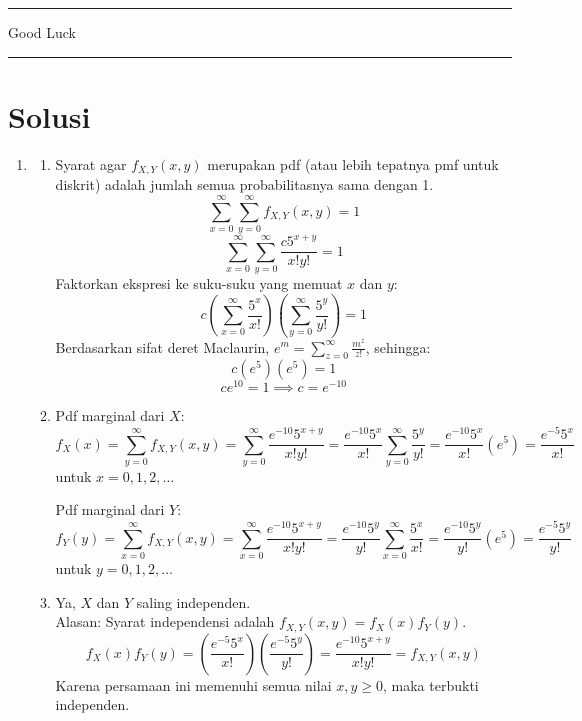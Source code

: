 \documentclass[12pt,a4paper]{article}
\begin{document}
\vspace{1cm}
\begin{center}
  \rule{3cm}{1.5pt} Good Luck \rule{3cm}{1.5pt}
\end{center}

\newpage
\section*{Solusi}

\begin{enumerate}
  \item
        \begin{enumerate}[label=(\alph*)]
          \item Syarat agar $f_{X,Y}(x,y)$ merupakan pdf (atau lebih tepatnya pmf untuk diskrit) adalah jumlah semua probabilitasnya sama dengan 1.
                \[ \sum_{x=0}^{\infty} \sum_{y=0}^{\infty} f_{X,Y}(x,y) = 1 \]
                \[ \sum_{x=0}^{\infty} \sum_{y=0}^{\infty} \frac{c5^{x+y}}{x!y!} = 1 \]
                Faktorkan ekspresi ke suku-suku yang memuat $x$ dan $y$:
                \[ c \left( \sum_{x=0}^{\infty} \frac{5^x}{x!} \right) \left( \sum_{y=0}^{\infty} \frac{5^y}{y!} \right) = 1 \]
                Berdasarkan sifat deret Maclaurin, $e^m = \sum_{z=0}^{\infty} \frac{m^z}{z!}$, sehingga:
                \[ c (e^5) (e^5) = 1 \]
                \[ c e^{10} = 1 \implies c = e^{-10} \]

          \item Pdf marginal dari $X$:
                \[ f_X(x) = \sum_{y=0}^{\infty} f_{X,Y}(x,y) = \sum_{y=0}^{\infty} \frac{e^{-10} 5^{x+y}}{x!y!} = \frac{e^{-10} 5^x}{x!} \sum_{y=0}^{\infty} \frac{5^y}{y!} = \frac{e^{-10} 5^x}{x!} (e^5) = \frac{e^{-5} 5^x}{x!} \]
                untuk $x = 0, 1, 2, \dots$

                Pdf marginal dari $Y$:
                \[ f_Y(y) = \sum_{x=0}^{\infty} f_{X,Y}(x,y) = \sum_{x=0}^{\infty} \frac{e^{-10} 5^{x+y}}{x!y!} = \frac{e^{-10} 5^y}{y!} \sum_{x=0}^{\infty} \frac{5^x}{x!} = \frac{e^{-10} 5^y}{y!} (e^5) = \frac{e^{-5} 5^y}{y!} \]
                untuk $y = 0, 1, 2, \dots$

          \item Ya, $X$ dan $Y$ saling independen. \\
                Alasan: Syarat independensi adalah $f_{X,Y}(x,y) = f_X(x) f_Y(y)$.
                \[ f_X(x) f_Y(y) = \left( \frac{e^{-5} 5^x}{x!} \right) \left( \frac{e^{-5} 5^y}{y!} \right) = \frac{e^{-10} 5^{x+y}}{x!y!} = f_{X,Y}(x,y) \]
                Karena persamaan ini memenuhi semua nilai $x, y \ge 0$, maka terbukti independen.
        \end{enumerate}


\end{enumerate}
\end{document}
